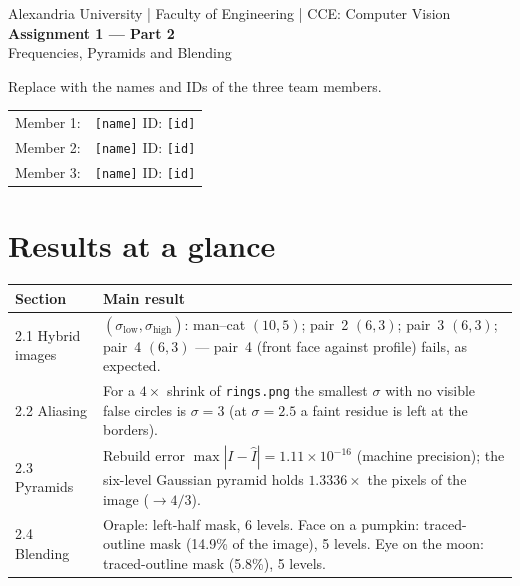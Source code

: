 \documentclass[11pt,a4paper]{article}
\newcommand{\sig}{\sigma}
\begin{document}
\begin{center}
  {\small Alexandria University \;|\; Faculty of Engineering \;|\; CCE: Computer Vision}\\[0.6em]
  {\LARGE\bfseries Assignment 1 --- Part 2}\\[0.3em]
  {\Large Frequencies, Pyramids and Blending}\\[0.8em]
\end{center}

\begin{todobox}
Replace with the names and IDs of the three team members.

\medskip
\begin{tabular}{@{}ll@{}}
Member 1: & \texttt{[name]} \quad ID: \texttt{[id]}\\
Member 2: & \texttt{[name]} \quad ID: \texttt{[id]}\\
Member 3: & \texttt{[name]} \quad ID: \texttt{[id]}
\end{tabular}
\end{todobox}

\section*{Results at a glance}

\begin{center}
\small
\begin{tabular}{@{}lp{10.2cm}@{}}
\toprule
\textbf{Section} & \textbf{Main result}\\
\midrule
2.1 Hybrid images & $(\sig_{\text{low}},\sig_{\text{high}})$: man--cat $(10,5)$; pair~2 $(6,3)$; pair~3 $(6,3)$; pair~4 $(6,3)$ --- pair~4 (front face against profile) fails, as expected.\\
2.2 Aliasing & For a $4\times$ shrink of \texttt{rings.png} the smallest $\sigma$ with no visible false circles is $\sigma = 3$ (at $\sigma=2.5$ a faint residue is left at the borders).\\
2.3 Pyramids & Rebuild error $\max|I-\hat I| = 1.11\times10^{-16}$ (machine precision); the six-level Gaussian pyramid holds $1.3336\times$ the pixels of the image ($\to 4/3$).\\
2.4 Blending & Oraple: left-half mask, 6 levels. Face on a pumpkin: traced-outline mask (14.9\% of the image), 5 levels. Eye on the moon: traced-outline mask (5.8\%), 5 levels.\\
\bottomrule
\end{tabular}
\end{center}
\end{document}
